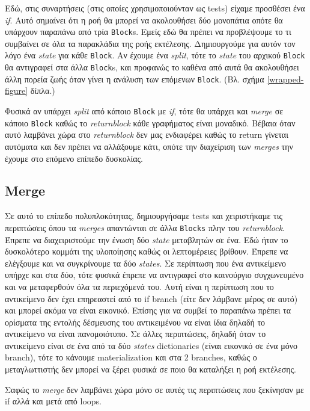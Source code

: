 Εδώ, στις συναρτήσεις (στις οποίες χρησιμοποιούνταν ως tests) είχαμε προσθέσει
ένα \textit{if}. Αυτό σημαίνει ότι η ροή θα μπορεί να ακολουθήσει δύο μονοπάτια
οπότε θα υπάρχουν παραπάνω από τρία \texttt{Block}s. Εμείς εδώ θα πρέπει να
προβλέψουμε το τι συμβαίνει σε όλα τα παρακλάδια της ροής εκτέλεσης.
Δημιουργούμε για αυτόν τον λόγο ένα \textit{state} για κάθε \texttt{Block}. Αν
έχουμε ένα \textit{split}, τότε το \textit{state} του αρχικού \texttt{Block} θα
αντιγραφεί στα άλλα \texttt{Block}s, και προφανώς το καθένα από αυτά θα
ακολουθήσει άλλη πορεία ζωής όταν γίνει η ανάλυση των επόμενων \texttt{Block}.
(Βλ. σχήμα \ref{wrapped-figure} δίπλα.)

Φυσικά αν υπάρχει \textit{split} από κάποιο \texttt{Block} με \textit{if}, τότε
θα υπάρχει και \textit{merge} σε κάποιο \texttt{Block} καθώς το
\textit{returnblock} κάθε γραφήματος είναι μοναδικό. Βέβαια όταν αυτό λαμβάνει
χώρα στο \textit{returnblock} δεν μας ενδιαφέρει καθώς το return γίνεται
αυτόματα και δεν πρέπει να αλλάξουμε κάτι, οπότε την διαχείριση των
\textit{merges} την έχουμε στο επόμενο επίπεδο δυσκολίας.

\subsection{Merge}

Σε αυτό το επίπεδο πολυπλοκότητας, δημιουργήσαμε tests και χειριστήκαμε τις
περιπτώσεις όπου τα \textit{merges} απαντώνται σε άλλα \texttt{Blocks} πλην
του \textit{returnblock}. Έπρεπε να διαχειριστούμε την ένωση δύο
\textit{state} μεταβλητών σε ένα. Εδώ ήταν το δυσκολότερο κομμάτι της
υλοποίησης καθώς οι λεπτομέρειες βρίθουν. Έπρεπε να ελέγξουμε και να
συγκρίνουμε τα δύο \textit{states}. Σε περίπτωση που ένα αντικείμενο υπήρχε
και στα δύο, τότε φυσικά έπρεπε να αντιγραφεί στο καινούργιο συγχωνευμένο και
να μεταφερθούν όλα τα περιεχόμενά του. Αυτή είναι η περίπτωση που το
αντικείμενο δεν έχει επηρεαστεί από το if branch (είτε δεν λάμβανε μέρος σε
αυτό) και μπορεί ακόμα να είναι εικονικό. Επίσης για να συμβεί το παραπάνω
πρέπει τα ορίσματα της εντολής δέσμευσης του αντικειμένου να είναι ίδια δηλαδή
το αντικείμενο να είναι πανομοιότυπο. Σε άλλες περιπτώσεις, δηλαδή όταν το
αντικείμενο είναι σε ένα από τα δύο \textit{states} dictionaries (είναι
εικονικό σε ένα μόνο branch), τότε το κάνουμε materialization και στα 2
branches, καθώς ο μεταγλωττιστής δεν μπορεί να ξέρει φυσικά σε ποιο θα
καταλήξει η ροή εκτέλεσης.

Σαφώς το \textit{merge} δεν λαμβάνει χώρα μόνο σε αυτές τις περιπτώσεις που
ξεκίνησαν με if αλλά και μετά από loops.

